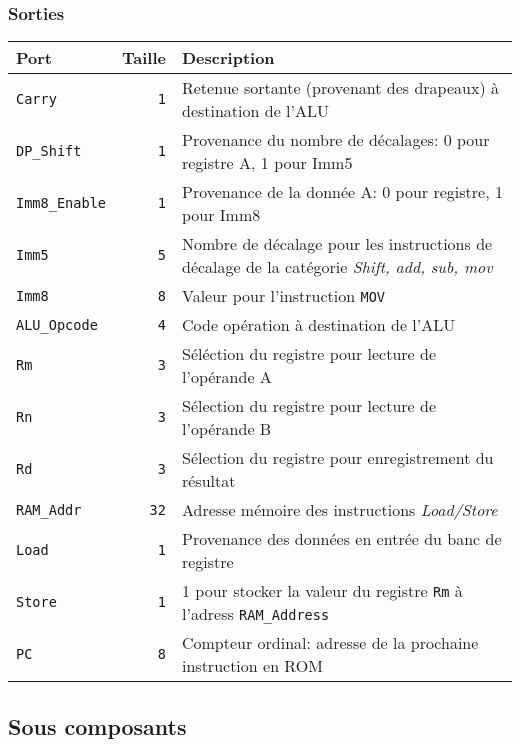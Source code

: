 \subsubsection{Sorties}

\begin{tabular}{|l|r|l|}
\hline 
\textbf{Port} & \textbf{Taille} & \textbf{Description}\\
\hline

\hline
\texttt{Carry}		&  \texttt{1} & Retenue sortante (provenant des drapeaux) à destination de l'ALU\\
\hline
\texttt{DP\_Shift}	&  \texttt{1} & Provenance du nombre de décalages: 0 pour registre A, 1 pour Imm5 \\
\hline
\texttt{Imm8\_Enable}	&  \texttt{1} & Provenance de la donnée A: 0 pour registre, 1 pour Imm8\\
\hline
\texttt{Imm5}		&  \texttt{5} & Nombre de décalage pour les instructions de décalage de la catégorie \textit{Shift, add, sub, mov}\\
\hline
\texttt{Imm8}		&  \texttt{8} & Valeur pour l'instruction \texttt{MOV}\\
\hline
\texttt{ALU\_Opcode}	&  \texttt{4} & Code opération à destination de l'ALU\\
\hline
\texttt{Rm}		&  \texttt{3} & Séléction du registre pour lecture de l'opérande A\\
\hline
\texttt{Rn}		&  \texttt{3} & Sélection du registre pour lecture de l'opérande B\\
\hline
\texttt{Rd}		&  \texttt{3} & Sélection du registre pour enregistrement du résultat\\
\hline
\texttt{RAM\_Addr}	& \texttt{32} & Adresse mémoire des instructions \textit{Load/Store}\\
\hline
\texttt{Load}		&  \texttt{1} & Provenance des données en entrée du banc de registre\\
\hline
\texttt{Store}		&  \texttt{1} & 1 pour stocker la valeur du registre \texttt{Rm} à l'adress \texttt{RAM\_Address}\\
\hline
\texttt{PC}		&  \texttt{8} & Compteur ordinal: adresse de la prochaine instruction en ROM\\


\hline
\end{tabular}

\subsection{Sous composants}

